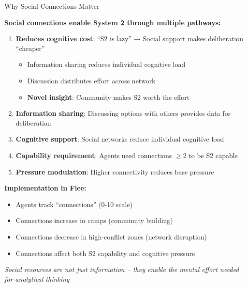 \documentclass[aspectratio=169]{beamer}
\begin{document}
\begin{frame}{Why Social Connections Matter}

\textbf{Social connections enable System 2 through multiple pathways:}

\begin{enumerate}
    \item \textbf{Reduces cognitive cost}: ``S2 is lazy'' → Social support makes deliberation ``cheaper''
    \begin{itemize}
        \item Information sharing reduces individual cognitive load
        \item Discussion distributes effort across network
        \item \textbf{Novel insight}: Community makes S2 worth the effort
    \end{itemize}
    
    \item \textbf{Information sharing}: Discussing options with others provides data for deliberation
    \item \textbf{Cognitive support}: Social networks reduce individual cognitive load
    \item \textbf{Capability requirement}: Agents need connections $\geq 2$ to be S2 capable
    \item \textbf{Pressure modulation}: Higher connectivity reduces base pressure
\end{enumerate}

\vspace{1em}

\textbf{Implementation in Flee:}
\begin{itemize}
    \item Agents track ``connections'' (0-10 scale)
    \item Connections increase in camps (community building)
    \item Connections decrease in high-conflict zones (network disruption)
    \item Connections affect both S2 capability and cognitive pressure
\end{itemize}

\vspace{0.5em}

\centering
\textit{Social resources are not just information – they enable the mental effort needed for analytical thinking}

\end{frame}
\end{document}
